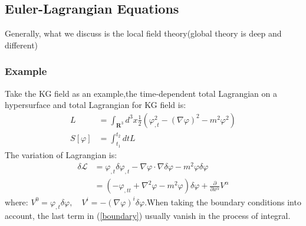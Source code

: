 \documentclass{article}
\begin{document}
\subsection{Euler-Lagrangian Equations}
Generally, what we discuss is the local field theory(global theory is deep and different)
\subsubsection{Example}
Take the KG field as an example,the time-dependent total Lagrangian on a hypersurface and total Lagrangian for KG field is:
\begin{align}
    L &= \int _ { \mathbf { R } ^ { 3 } } d ^ { 3 } x \frac { 1 } { 2 } \left( \varphi _ { , t } ^ { 2 } - ( \nabla \varphi ) ^ { 2 } - m ^ { 2 } \varphi ^ { 2 } \right)\\
    S [ \varphi ] &= \int _ { t _ { 1 } } ^ { t _ { 2 } } d t L
\end{align}
The variation of Lagrangian is:
\begin{equation}\label{boundary}
\begin{aligned} 
\delta \mathcal { L } & = \varphi _ { , t } \delta \varphi _ { , t } - \nabla \varphi \cdot \nabla \delta \varphi - m ^ { 2 } \varphi \delta \varphi \\ 
& = \left( - \varphi _ { , t t } + \nabla ^ { 2 } \varphi - m ^ { 2 } \varphi \right) \delta \varphi + \frac { \partial } { \partial x ^ { \alpha } } V ^ { \alpha }
\end{aligned}
\end{equation}
where: $V ^ { 0 } = \varphi _ { , t } \delta \varphi , \quad V ^ { i } = - ( \nabla \varphi ) ^ { i } \delta \varphi$.When taking the boundary conditions into account, 
the last term in (\ref{boundary}) usually vanish in the process of integral. 
\end{document}
